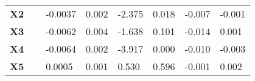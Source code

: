 \begin{center}
\begin{longtable}{p{0.18\linewidth}p{0.1\linewidth}p{0.1\linewidth}p{0.1\linewidth}p{0.1\linewidth}p{0.12\linewidth}p{0.1\linewidth}}
		\textbf{X2}             & -0.0037       & 0.002            & -2.375     & 0.018               & -0.007          & -0.001          \\
		\textbf{X3}             & -0.0062       & 0.004            & -1.638     & 0.101               & -0.014          & 0.001           \\
		\textbf{X4}             & -0.0064       & 0.002            & -3.917     & 0.000               & -0.010          & -0.003          \\
		\textbf{X5}             & 0.0005        & 0.001            & 0.530      & 0.596               & -0.001          & 0.002           \\
		\bottomrule
	\end{longtable}
\end{center}
